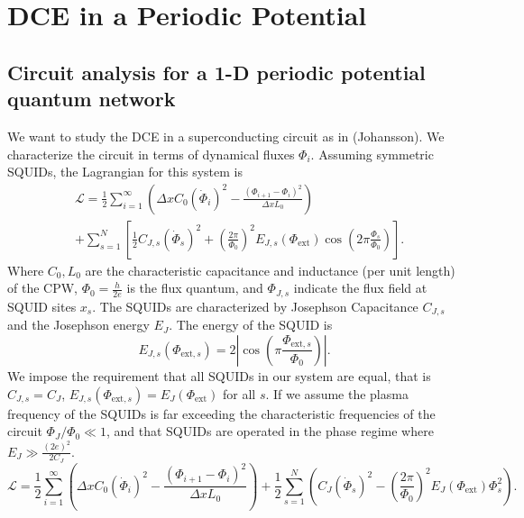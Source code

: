 \chapter{DCE in a Periodic Potential} %


\section{Circuit analysis for a 1-D periodic potential quantum network}\label{sec:circ_an}
We want to study the DCE in a superconducting circuit as in (Johansson). We characterize the circuit in terms of dynamical fluxes $\Phi_i$. Assuming symmetric SQUIDs, the Lagrangian for this system is
\begin{equation}
\begin{split}
&\mathcal{L}=\frac{1}{2}\sum_{i=1}^{\infty}\left(\Delta x C_{0} \left(\dot{\Phi}_{i}\right)^{2} - 
\frac{\left(\Phi_{i+1}-\Phi_{i}\right)^{2}}{\Delta x L_{0}}\right)\\
&+ \sum_{s=1}^{N}\left[\frac{1}{2}C_{J, s}\left(\dot{\Phi}_{s}\right)^{2}+\left(\frac{2\pi}{\Phi_{0}}\right)^{2} E_{J, s}\left(\Phi_{\text{ext}}\right) \cos\left(2\pi \frac{\Phi_{s}}{\Phi_0}\right)\right].
\end{split}
\end{equation}
Where $C_0, L_0$ are the characteristic capacitance and inductance (per unit length) of the CPW, $\Phi_0=\frac{h}{2e}$ is the flux quantum, and $\Phi_{J,s}$ indicate the flux field at SQUID sites $x_s$. The SQUIDs are characterized by Josephson Capacitance $C_{J,s}$ and the Josephson energy $E_J$. The energy of the SQUID is
\begin{equation}
    E_{J,s} (\Phi_{\text{ext},s}) = 2 \left\vert \cos\left(\pi \frac{\Phi_{\text{ext},s}}{\Phi_0}\right)\right\vert .
\end{equation}
We impose the requirement that all SQUIDs in our system are equal, that is $C_{J,s} = C_J$, $E_{J,s}(\Phi_{\text{ext},s}) = E_J(\Phi_{\text{ext}}) $ for all $s$.
If we assume the plasma frequency of the SQUIDs is far exceeding the characteristic frequencies of the circuit $\Phi_J/\Phi_0 \ll 1$, and that SQUIDs are operated in the phase regime where $E_J \gg \frac{(2e)^2}{2C_J}$. 
\begin{equation}
\mathcal{L}=\frac{1}{2}\sum_{i=1}^{\infty}\left(\Delta x C_{0} \left(\dot{\Phi}_{i}\right)^{2} - 
\frac{\left(\Phi_{i+1}-\Phi_{i}\right)^{2}}{\Delta x L_{0}}\right) 
 + \frac{1}{2} \sum_{s=1}^{N}\left(C_J\left(\dot{\Phi}_{s}\right)^{2}-\left(\frac{2\pi}{\Phi_{0}}\right)^{2} E_J\left(\Phi_{\text{ext}}\right) \Phi_{s}^{2}\right).
\end{equation}
